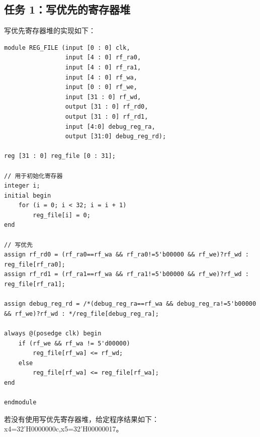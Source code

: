 \documentclass[12pt,a4paper]{ctexart}
\begin{document}
\subsection{任务 1：写优先的寄存器堆}
写优先寄存器堆的实现如下：
\begin{lstlisting}[style=verilog]
module REG_FILE (input [0 : 0] clk,
                 input [4 : 0] rf_ra0,
                 input [4 : 0] rf_ra1,
                 input [4 : 0] rf_wa,
                 input [0 : 0] rf_we,
                 input [31 : 0] rf_wd,
                 output [31 : 0] rf_rd0,
                 output [31 : 0] rf_rd1,
                 input [4:0] debug_reg_ra,
                 output [31:0] debug_reg_rd);

reg [31 : 0] reg_file [0 : 31];

// 用于初始化寄存器
integer i;
initial begin
    for (i = 0; i < 32; i = i + 1)
        reg_file[i] = 0;
end

// 写优先
assign rf_rd0 = (rf_ra0==rf_wa && rf_ra0!=5'b00000 && rf_we)?rf_wd : reg_file[rf_ra0];
assign rf_rd1 = (rf_ra1==rf_wa && rf_ra1!=5'b00000 && rf_we)?rf_wd : reg_file[rf_ra1];

assign debug_reg_rd = /*(debug_reg_ra==rf_wa && debug_reg_ra!=5'b00000 && rf_we)?rf_wd : */reg_file[debug_reg_ra];

always @(posedge clk) begin
    if (rf_we && rf_wa != 5'd00000)
        reg_file[rf_wa] <= rf_wd;
    else
        reg_file[rf_wa] <= reg_file[rf_wa];
end

endmodule
\end{lstlisting}
若没有使用写优先寄存器堆，给定程序结果如下：
x4=32'H0000000c,x5=32'H00000017。
\end{document}
